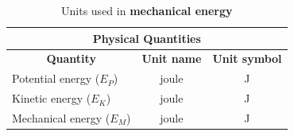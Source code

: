     \par


\begin{table}[H]
\begin{center}
\begin{tabular}{|l|c|c|}\hline \hline 
\multicolumn{3}{|c|}{\textbf{Physical Quantities}}\\ \hline \hline
\multicolumn{1}{|c|}{\textbf{Quantity}} & \textbf{Unit name} & \textbf{Unit symbol}\\ \hline
Potential energy ($E_{P}$) & joule & J \\ \hline
Kinetic energy ($E_{K}$) & joule & J \\ \hline
Mechanical energy ($E_{M}$) & joule & J \\ \hline
\end{tabular}
\end{center}
\caption{Units used in \textbf{mechanical energy} }
\label{table:electrostatics::units}
\end{table}




